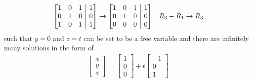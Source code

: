 \begin{Answer}
\begin{align*}
\left[
\begin{array}{@{}ccc|c@{}}
1 & 0 & 1 & 1\\
0 & 1 & 0 & 0 \\
1 & 0 & 1 & 1
\end{array}
\right]
&\to
\left[
\begin{array}{@{}ccc|c@{}}
1 & 0 & 1 & 1\\
0 & 1 & 0 & 0 \\
0 & 0 & 0 & 0
\end{array}
\right] & R_3 - R_1 \to R_3
\end{align*}
such that $y = 0$ and $z = t$ can be set to be a free variable and there are infinitely many solutions in the form of 
\begin{align*}
\begin{bmatrix}
x \\
y \\
z 
\end{bmatrix}
=
\begin{bmatrix}
1 \\
0 \\
0
\end{bmatrix}
+
t
\begin{bmatrix}
-1 \\
0 \\
1
\end{bmatrix}
\end{align*}
\end{Answer}

